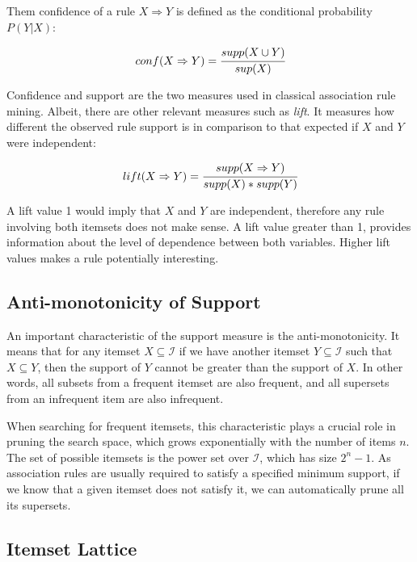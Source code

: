 Them confidence of a rule $X \Rightarrow Y$ is defined as the conditional probability $P(Y|X)$:

\begin{equation}
 conf(X \Rightarrow Y)=\cfrac{supp(X \cup Y)}{sup(X)}
\end{equation}

Confidence and support are the two measures used in classical association rule mining. Albeit, there are other relevant
measures such as \emph{lift}. It measures how different the observed rule support is in comparison to that expected if
$X$ and $Y$ were independent:

\begin{equation}
 lift(X \Rightarrow Y)=\cfrac{supp(X \Rightarrow Y)}{supp(X)*supp(Y)}
\end{equation}

A lift value 1 would imply that $X$ and $Y$ are independent, therefore any rule involving both itemsets does not make
sense. A lift value greater than 1, provides information about the level of dependence between both variables. Higher
lift values makes a rule potentially interesting.

\subsection{Anti-monotonicity of Support}

An important characteristic of the support measure is the anti-monotonicity. It means that for any itemset $X
\subseteq \mathcal{I}$ if we have another itemset $Y \subseteq \mathcal{I}$ such that $X \subseteq Y$, then the support
of $Y$ cannot be greater than the support of $X$. In other words, all subsets from a frequent itemset are also frequent,
and all supersets from an infrequent item are also infrequent.

When searching for frequent itemsets, this characteristic plays a crucial role in pruning the search space, which grows
exponentially with the number of items $n$. The set of possible itemsets is the power set over $\mathcal{I}$, which has
size $2^n-1$. As association rules are usually required to satisfy a specified minimum support, if we know that a given
itemset does not satisfy it, we can automatically prune all its supersets.

\subsection{Itemset Lattice}

